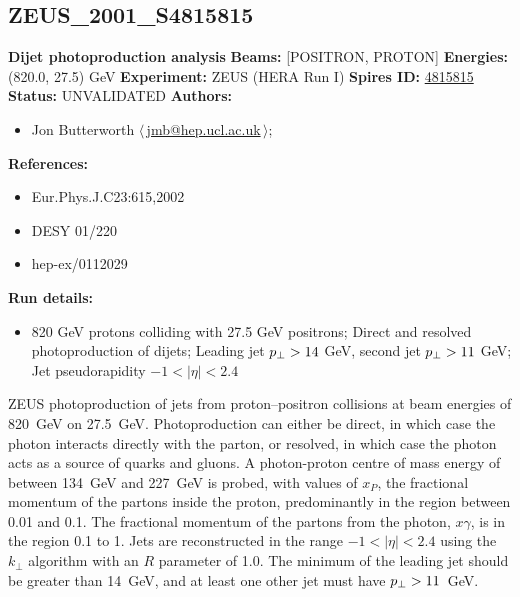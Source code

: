 \clearpage


\clearpage

\subsection[ZEUS\_2001\_S4815815]{ZEUS\_2001\_S4815815\,\cite{Chekanov:2001bw}}
\textbf{Dijet photoproduction analysis}\newline
\textbf{Beams:} [POSITRON, PROTON] \newline
\textbf{Energies:} (820.0, 27.5) GeV \newline
\textbf{Experiment:} ZEUS (HERA Run I) \newline
\textbf{Spires ID:} \href{http://www.slac.stanford.edu/spires/find/hep/www?rawcmd=key+4815815}{4815815}\newline
\textbf{Status:} UNVALIDATED\newline
\textbf{Authors:}
\begin{itemize}
  \item Jon Butterworth $\langle\,$\href{mailto:jmb@hep.ucl.ac.uk}{jmb@hep.ucl.ac.uk}$\,\rangle$;
\end{itemize}
\textbf{References:}
\begin{itemize}
  \item Eur.Phys.J.C23:615,2002
  \item DESY 01/220
  \item hep-ex/0112029
\end{itemize}
\textbf{Run details:}
\begin{itemize}

  \item 820 GeV protons colliding with 27.5 GeV positrons; Direct and resolved photoproduction of dijets; Leading jet $p_\perp > 14$ GeV, second jet $p_\perp > 11$ GeV; Jet pseudorapidity $-1 < |\eta| < 2.4$\end{itemize}

\noindent ZEUS photoproduction of jets from proton--positron collisions at beam energies of 820~GeV on 27.5~GeV. Photoproduction can either be direct, in which case the photon interacts directly with the parton, or resolved, in which case the photon acts as a source of quarks and gluons. A photon-proton centre of mass energy of between 134~GeV and 227~GeV is probed, with values of $x_P$, the fractional momentum of the partons inside the proton, predominantly in the region between 0.01 and 0.1. The fractional momentum of the partons from the photon, $x\gamma$, is in the region 0.1 to 1. Jets are reconstructed in the range $-1 < |\eta| < 2.4$ using the $k_\perp$ algorithm with an $R$ parameter of 1.0. The minimum \pT of the leading jet should be greater than 14~GeV, and at least one other jet must have $p_\perp > 11$~GeV.

